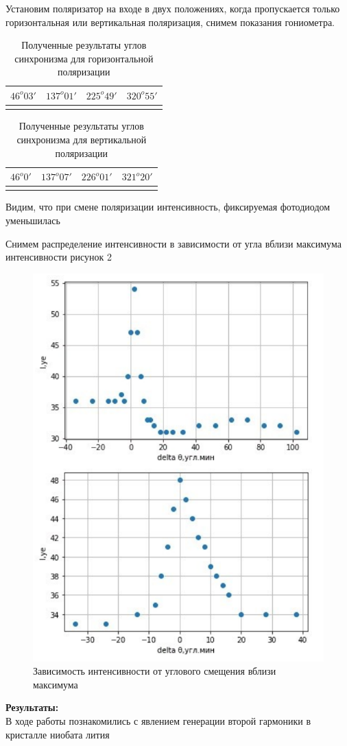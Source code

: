\documentclass[a4paper, 12pt]{article}%
\begin{document}
	\par Установим поляризатор на входе в двух положениях, когда пропускается только горизонтальная или вертикальная поляризация, снимем показания гониометра.
	
	\begin{longtable}{|c|c|c|c|}
			\hline
			$46^o03'$& $137^o01'$&$225^o49'$ &$320^o55'$\\
			\hline
		\caption{Полученные результаты углов синхронизма для горизонтальной поляризации}
	\end{longtable}
	
	\begin{longtable}{|c|c|c|c|}
		\hline
		$46^o0'$&$137^o07' $&$226^o01' $&$321^o20'$\\
		\hline
		\caption{Полученные результаты углов синхронизма для вертикальной поляризации}
	\end{longtable}
	
	Видим, что при смене поляризации интенсивность, фиксируемая фотодиодом уменьшилась
	\par Снимем распределение интенсивности в зависимости от угла вблизи максимума интенсивности рисунок 2
	
	\begin{figure}[H]
		\centering
		\includegraphics[width=0.6\linewidth]{graph.png}
		\caption{Зависимость интенсивности от углового смещения вблизи максимума}
		\label{fig:enter-label}
	\end{figure}
	
	\textbf{Результаты: }\\
	
	В ходе работы познакомились с явлением генерации второй гармоники в кристалле ниобата лития
	
	
	
	
	
	
	
	
	
	
	
\end{document}
